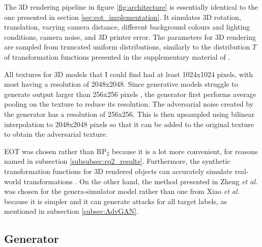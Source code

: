 The 3D rendering pipeline in figure \ref{fig:architecture} is essentially identical to the one presented in section \ref{sec:eot_implementation}. It simulates 3D rotation, translation, varying camera distance, different background colours and lighting conditions, camera noise, and 3D printer error. The parameters for 3D rendering are sampled from truncated uniform distributions, similarly to the distribution $T$ of transformation functions presented in the supplementary material of \cite{athalye}. 

All textures for 3D models that I could find had at least 1024x1024 pixels, with most having a resolution of 2048x2048. Since generative models struggle to generate output larger than 256x256 pixels \cite{big_gan}, the generator first performs average pooling on the texture to reduce its resolution. The adversarial noise created by the generator has a resolution of 256x256. This is then upsampled using bilinear interpolation to 2048x2048 pixels so that it can be added to the original texture to obtain the adversarial texture.

EOT \cite{athalye} was chosen rather than $\textrm{RP}_2$ \cite{evtimov_road_signs} because it is a lot more convenient, for reasons named in subsection \ref{subsubsec:rp2_results}. Furthermore, the synthetic transformation functions for 3D rendered objects can accurately simulate real-world transformations \cite{athalye}. On the other hand, the method presented in Zheng \textit{et al.} \cite{zheng_black_box_GAN} was chosen for the genera-simulator model rather than one from Xiao \textit{et al.} \cite{advGAN} because it is simpler and it can generate attacks for all target labels, as mentioned in subsection \ref{subsec:AdvGAN}.

\subsection{Generator}

